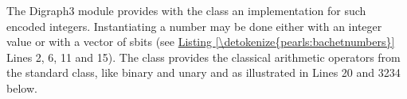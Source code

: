 \documentclass[a4paper,12pt,english]{sphinxhowto}
\begin{document}
\sphinxAtStartPar
The Digraph3  module provides with the  class an implementation for such  encoded integers. Instantiating a  number may be done either with an integer value or with a vector of sbits (see \hyperref[\detokenize{pearls:bachetnumbers}]{Listing \ref{\detokenize{pearls:bachetnumbers}}} Lines  2, 6, 11 and 15). The class provides the classical arithmetic operators from the standard  class, like binary  and unary  and  as illustrated in Lines 20 and 32\sphinxhyphen{}34 below.
\def\sphinxLiteralBlockLabel{\label{\detokenize{pearls:bachetnumbers}}}
%
\end{document}
